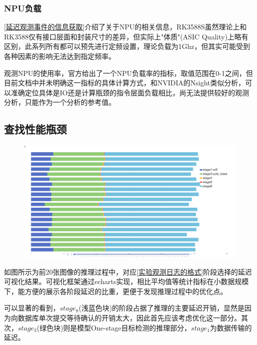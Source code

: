 \documentclass[master,anonymous]{shtthesis}
\begin{document}
\subsubsection{NPU负载}
\ref{延迟观测事件的信息获取}介绍了关于NPU的相关信息，RK3588S虽然理论上和RK3588仅有接口层面和封装尺寸的差异，但实际上"体质"(ASIC Quality)上略有区别，此系列所有都可以预先进行定频设置，理论负载为1Ghz，但其实可能受到各种因素的影响无法达到指定频率。

观测NPU的使用率，官方给出了一个NPU负载率的指标，取值范围在0-1之间，但目前文档中并未明确这一指标的具体计算方式，和NVIDIA的Nsight类似分析，可以准确定位具体是IO还是计算瓶颈的指令层面负载相比，尚无法提供较好的观测分析，只能作为一个分析的参考值。

\subsection{查找性能瓶颈}
\begin{figure}[H]
	\centering
	\includegraphics[width=15cm]{img/echarts.png}
	\label{延迟阶段选择结果可视化}
\end{figure}

如图所示为前20张图像的推理过程中，对应\ref{实验观测日志的格式}阶段选择的延迟可视化结果。可视化框架通过echarts实现，相比平均值等统计指标在小数据规模下，能方便的展示各阶段延迟的比重，更便于发现推理过程中的优化点。

可以显著的看到，$stage_8$(浅蓝色块)的阶段占据了推理的主要延迟开销，显然是因为向数据库单次提交等待确认的开销太大，因此首先应该考虑优化这一部分。其次，$stage_3$(绿色块)则是模型One-stage目标检测的推理部分，$stage_1$为数据传输的延迟。
\end{document}
